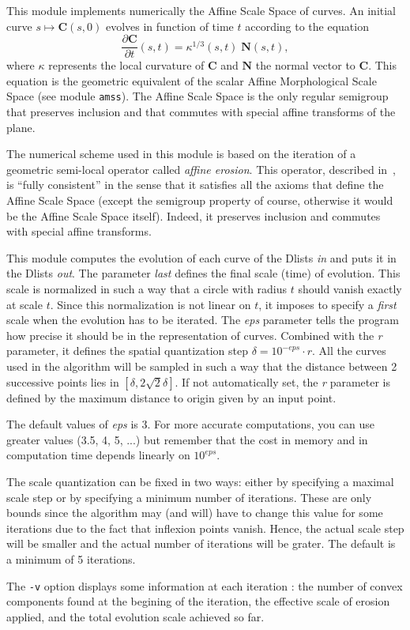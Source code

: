 This module implements numerically the Affine Scale Space 
 of curves.
An initial curve $s\mapsto {\mathbf C}(s,0)$ evolves in function 
of time $t$ according to the 
equation
$$\frac{\partial {\mathbf C}}{\partial t}(s,t) 
= \kappa^{1/3}(s,t) \; {\mathbf N}(s,t),$$
where $\kappa$ represents the local curvature of ${\mathbf C}$ and
${\mathbf N}$ the normal vector to ${\mathbf C}$. This equation is
the geometric equivalent of the scalar Affine Morphological Scale
Space (see module \verb+amss+).
The Affine Scale Space is the only regular semigroup that preserves 
inclusion and that commutes with special affine transforms of the plane.

\medskip

The numerical scheme used in this module is based on the iteration
of a geometric semi-local operator called {\em affine erosion}.
This operator, described in~\cite{moisan:affine}, is ``fully consistent'' in the
sense that it satisfies all the axioms that define the Affine Scale
Space (except the semigroup property of course, otherwise it would be
the Affine Scale Space itself). Indeed, it preserves inclusion
and commutes with special affine transforms.

\medskip

This module computes the evolution of each curve of the Dlists {\em in}
and puts it in the Dlists {\em out}.
The parameter {\em last} defines the final scale (time) of evolution.
This scale is normalized in such a way that a circle with radius $t$
should vanish exactly at scale $t$. Since this normalization is not 
linear on $t$, it imposes to specify a {\em first} scale when the 
evolution has to be iterated. The {\em eps} parameter tells the program
how precise it should be in the representation of curves. Combined
with the {\em r} parameter, it defines the spatial quantization step
$\delta = 10^{-eps} \cdot r$. 
All the curves used in the algorithm will
be sampled in such a way that the distance between 2 successive points
lies in $[\delta,2\sqrt 2\delta]$. If not automatically set, the {\em r}
parameter is defined by the maximum distance to origin given by an
input point.

The default values of {\em eps} is 3. For more accurate computations,
you can use greater values (3.5, 4, 5, ...) but remember that
the cost in memory and in computation time depends linearly on $10^{eps}$.

\medskip

The scale quantization can be fixed in two ways: either by specifying
a maximal scale step or by specifying a minimum number of iterations.
These are only bounds since the algorithm may (and will) have to change
this value for some iterations due to the fact that inflexion points
vanish. Hence, the actual scale step will be smaller and the actual
number of iterations will be grater. The default is a minimum of 5 iterations.

\medskip

The \verb+-v+ option displays some information at each iteration :
the number of convex components found at the begining of the iteration,
the effective scale of erosion applied, and the total evolution scale
achieved so far.

